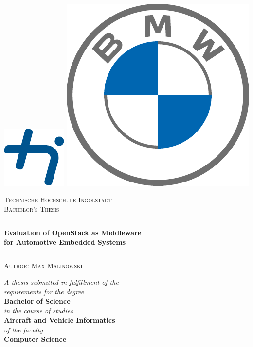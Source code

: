 \documentclass[
    10pt,
    english,
    twoside,
    titlepage
]{report}
\begin{document}
\pagestyle{fancy}

\begin{titlepage}
    \begin{center}
    
        \includegraphics[height=0.2\textwidth]{00_thi-logo.pdf}
        \hfill
        \includegraphics[height=0.2\textwidth]{00_bmw-logo.pdf}
        
        \vfill
        
        \textsc{\LARGE Technische Hochschule Ingolstadt\\}
        \vspace*{.04\textheight}
        \textsc{\Large Bachelor's Thesis\\}
        \vspace*{.04\textheight}
        \hrule
        \vspace*{.015\textheight}
        {\huge \bfseries \color{thi_blue} Evaluation of OpenStack as Middleware\\ for Automotive Embedded Systems \par}
        \vspace*{.015\textheight}
        \hrule
        \vspace*{.04\textheight}
        \textsc{\Large Author: Max Malinowski}
        
        \vfill
        
        \textit{\large A thesis submitted in fulfillment of the}\\[0.2cm]
        \textit{\large requirements for the degree}\\[0.2cm]
        \textbf{\large Bachelor of Science}\\[0.2cm]
        \textit{\large in the course of studies}\\[0.2cm]
        \textbf{\large Aircraft and Vehicle Informatics}\\[0.2cm]
        \textit{\large of the faculty}\\[0.2cm]
        \textbf{\large Computer Science}
        

\end{center}
\end{titlepage}
\end{document}
